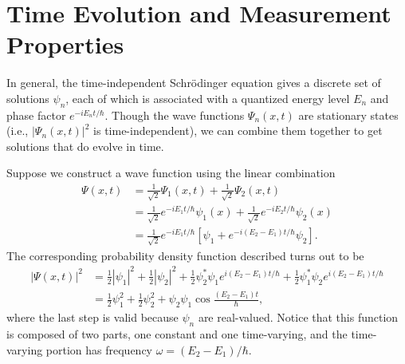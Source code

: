 \documentclass[../p052main.tex]{subfiles}
\begin{document}

\section{Time Evolution and Measurement Properties}
In general, the time-independent Schrödinger equation gives a discrete set of solutions $\psi_n$, each of which is associated with a quantized energy level $E_n$ and phase factor $e^{-i E_n t / \hbar}$.
Though the wave functions $\Psi_n(x,t)$ are stationary states (i.e., $|\Psi_n(x,t)|^2$ is time-independent), we can combine them together to get solutions that do evolve in time.

\begin{example}[]
    Suppose we construct a wave function using the linear combination
    \begin{align*}
        \Psi(x,t) &= \frac{1}{\sqrt{2}} \Psi_1(x,t) + \frac{1}{\sqrt{2}} \Psi_2(x,t) \\
        &= \frac{1}{\sqrt{2}} e^{-i E_1 t / \hbar} \psi_1(x) + \frac{1}{\sqrt{2}} e^{-i E_2 t / \hbar} \psi_2(x) \\
        &= \frac{1}{\sqrt{2}} e^{-i E_1 t /\hbar} \left[ \psi_1 + e^{-i (E_2 - E_1) t / \hbar} \psi_2 \right].
    \end{align*}
    The corresponding probability density function described turns out to be
    \begin{align*}
        |\Psi(x,t)|^2 &= \frac{1}{2} |\psi_1|^2 + \frac{1}{2}|\psi_2|^2 + \frac{1}{2} \psi_2^* \psi_1 e^{i (E_2 - E_1) t /\hbar} + \frac{1}{2} \psi_1^* \psi_2 e^{i (E_2 - E_1) t /\hbar} \\
        &= \frac{1}{2} \psi_1^2 + \frac{1}{2} \psi_2^2 + \psi_2 \psi_1 \cos \frac{(E_2 - E_1) t}{\hbar},
    \end{align*}
    where the last step is valid because $\psi_n$ are real-valued.
    Notice that this function is composed of two parts, one constant and one time-varying, and the time-varying portion has frequency $\omega = (E_2 - E_1) / \hbar$.
\end{example}
\end{document}
